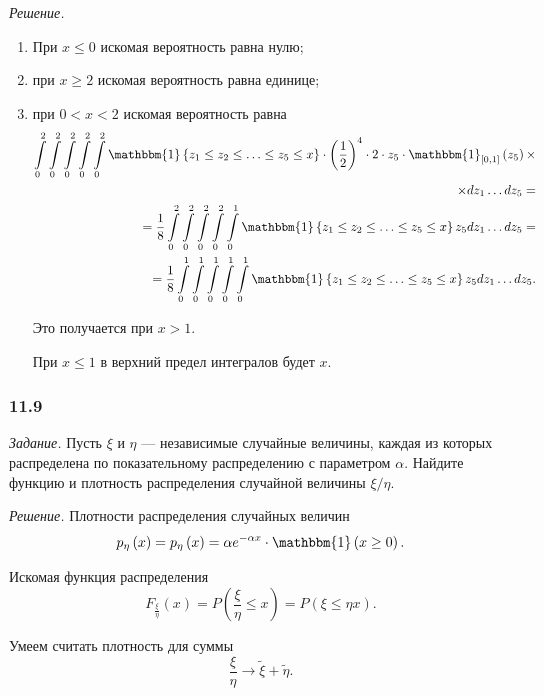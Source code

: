 \textit{Решение.}
\begin{enumerate}
\item При $x \leq 0$ искомая вероятность равна нулю;
\item при $x \geq 2$ искомая вероятность равна единице;
\item при $0 < x < 2$ искомая вероятность равна
\begin{equation*}
\begin{split}
\int \limits_0^2 \int \limits_0^2 \int \limits_0^2 \int \limits_0^2 \int \limits_0^2 \mathbbm{1} \left\{ z_1 \leq z_2 \leq \dotsc \leq z_5 \leq x \right\} \cdot
\left( \frac{1}{2} \right)^4 \cdot 2 \cdot z_5 \cdot \mathbbm{1}_{ \left[ 0, 1 \right] } \left( z_5 \right) \times \\
\times dz_1 \dotsc dz_5 = \\
= \frac{1}{8} \int \limits_0^2 \int \limits_0^2 \int \limits_0^2 \int \limits_0^2 \int \limits_0^1
\mathbbm{1} \left\{ z_1 \leq z_2 \leq \dotsc \leq z_5 \leq x \right\} z_5 dz_1 \dotsc dz_5 = \\
= \frac{1}{8} \int \limits_0^1 \int \limits_0^1 \int \limits_0^1 \int \limits_0^1 \int \limits_0^1
\mathbbm{1} \left\{ z_1 \leq z_2 \leq \dotsc \leq z_5 \leq x \right\} z_5 dz_1 \dotsc dz_5.
\end{split}
\end{equation*}

Это получается при $x > 1$.

При $x \leq 1$ в верхний предел интегралов будет $x$.
\end{enumerate}

\subsubsection*{11.9}

\textit{Задание.} Пусть $ \xi $ и $ \eta $ --- независимые случайные величины, каждая из которых распределена по показательному распределению с параметром $ \alpha $.
Найдите функцию и плотность распределения случайной величины $ \xi/\eta $.

\textit{Решение.}
Плотности распределения случайных величин
$$p_{ \eta } \left( x \right) =
p_{ \eta } \left( x \right) =
\alpha e^{- \alpha x} \cdot \mathbbm{1} \left( x \geq 0 \right).$$

Искомая функция распределения
$$F_{ \frac{ \xi }{ \eta }} \left( x \right) =
P \left( \frac{ \xi }{ \eta } \leq x \right) =
P \left( \xi \leq \eta x \right).$$

Умеем считать плотность для суммы
$$ \frac{ \xi }{ \eta } \rightarrow \tilde{ \xi } + \tilde{ \eta }.$$

